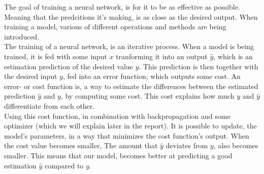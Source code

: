 The goal of training a neural network, is for it to be as effective as possible. Meaning that the predcitions it's making, is as close as the desired output. When training a model, various of different operations and methods are being introduced. \\

\noindent
The training of a neural network, is an iterative process. When a model is being trained, it is fed with some input $x$ tranforming it into an output $\hat{y}$, which is an estimation prediction of the desired value $y$. This prediction is then together with the desired input $y$, fed into an error function; which outputs some cost. An error- or cost function is, a way to estimate the differences between the estimated prediction $\hat{y}$ and $y$, by computing some cost. This cost explains how much $y$ and $\hat{y}$ differentiate from each other.\\

\noindent
Using this cost function, in combination with backpropagation and some optimizer (which we will explain later in the report). It is possible to update, the model's parameters, in a way that minimizes the cost function's output. When the cost value becomes smaller, The amount that $\hat{y}$ deviates from $y$, also becomes smaller. This means that our model, becomes better at predicting a good estimation $\hat{y}$ compared to $y$.

